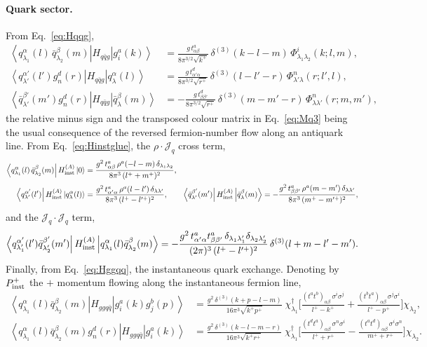 \documentclass[11pt]{article}
\newcommand{\dg}{\dagger}
\newcommand{\me}[3]{\left\langle #1 \right| #2 \left| #3 \right\rangle}
\newcommand{\dthree}{\delta^{(3)}}
\newcommand{\gl}[3]{g^{#1}_{#2}(#3)}
\newcommand{\qk}[3]{q^{#1}_{#2}(#3)}
\newcommand{\aqk}[3]{\bar q^{#1}_{#2}(#3)}
\newcommand{\Phiv}{\Phi}
\newcommand{\Hqqg}{H_{q\bar q g}}
\newcommand{\Hggqq}{H_{ggq\bar q}}
\begin{document}
\paragraph{Quark sector.} From Eq.~\eqref{eq:Hqqg},
\begin{align}
\me{\qk{\alpha}{\lambda_1}{l}\,\aqk{\beta}{\lambda_2}{m}}{\Hqqg}{\gl{a}{i}{k}}
&=\frac{g\,t^a_{\alpha\beta}}{8\pi^{3/2}\sqrt{k^+}}\,\dthree(k-l-m)\,
\Phiv^i_{\lambda_1\lambda_2}(k;l,m),
\label{eq:Mq1}\\[2pt]
\me{\qk{\alpha'}{\lambda'}{l'}\gl{d}{n}{r}}{\Hqqg}{\qk{\alpha}{\lambda}{l}}
&=\frac{g\,t^d_{\alpha'\alpha}}{8\pi^{3/2}\sqrt{r^+}}\,\dthree(l-l'-r)\,
\Phiv^n_{\lambda'\lambda}(r;l',l),
\label{eq:Mq2}\\[2pt]
\me{\aqk{\beta'}{\lambda'}{m'}\gl{d}{n}{r}}{\Hqqg}{\aqk{\beta}{\lambda}{m}}
&=-\frac{g\,t^d_{\beta\beta'}}{8\pi^{3/2}\sqrt{r^+}}\,\dthree(m-m'-r)\,
\Phiv^n_{\lambda\lambda'}(r;m,m'),
\label{eq:Mq3}
\end{align}
the relative minus sign and the transposed colour matrix in Eq.~\eqref{eq:Mq3} being the usual
consequence of the reversed fermion-number flow along an antiquark line. From
Eq.~\eqref{eq:Hinstglue}, the $\rho\!\cdot\!\mathcal J_q$ cross term,
\begin{align}
\me{\qk{\alpha}{\lambda_1}{l}\,\aqk{\beta}{\lambda_2}{m}}{H^{(A)}_{\rm inst}}{0}
&=\frac{g^2\,t^a_{\alpha\beta}\,\rho^a(-l-m)\,\delta_{\lambda_1\lambda_2}}{8\pi^3\,(l^++m^+)^2},
\label{eq:Mq4}\\[2pt]
\me{\qk{\alpha'}{\lambda'}{l'}}{H^{(A)}_{\rm inst}}{\qk{\alpha}{\lambda}{l}}
&=\frac{g^2\,t^a_{\alpha'\alpha}\,\rho^a(l-l')\,\delta_{\lambda\lambda'}}{8\pi^3\,(l^+-l'^+)^2},
\qquad
\me{\aqk{\beta'}{\lambda'}{m'}}{H^{(A)}_{\rm inst}}{\aqk{\beta}{\lambda}{m}}
=-\frac{g^2\,t^a_{\beta\beta'}\,\rho^a(m-m')\,\delta_{\lambda\lambda'}}{8\pi^3\,(m^+-m'^+)^2},
\label{eq:Mq5}
\end{align}
and the $\mathcal J_q\!\cdot\!\mathcal J_q$ term,
\begin{equation}
\me{\qk{\alpha'}{\lambda_1'}{l'}\aqk{\beta'}{\lambda_2'}{m'}}{H^{(A)}_{\rm inst}}
{\qk{\alpha}{\lambda_1}{l}\aqk{\beta}{\lambda_2}{m}}
=-\frac{g^2\,t^a_{\alpha'\alpha}t^a_{\beta\beta'}\,
\delta_{\lambda_1\lambda_1'}\delta_{\lambda_2\lambda_2'}}
{(2\pi)^3\,(l^+-l'^+)^2}\,\dthree(l+m-l'-m').
\label{eq:Mq6}
\end{equation}
Finally, from Eq.~\eqref{eq:Hggqq}, the instantaneous quark exchange. Denoting by $P^+_{\rm inst}$
the $+$ momentum flowing along the instantaneous fermion line,
\begin{align}
\me{\qk{\alpha}{\lambda_1}{l}\aqk{\beta}{\lambda_2}{m}}{\Hggqq}{\gl{a}{i}{k}\gl{b}{j}{p}}
&=\frac{g^2\,\dthree(k+p-l-m)}{16\pi^3\sqrt{k^+p^+}}\;
\chi^\dg_{\lambda_1}\Big[\frac{(t^at^b)_{\alpha\beta}\,\sigma^i\sigma^j}{l^+-k^+}
+\frac{(t^bt^a)_{\alpha\beta}\,\sigma^j\sigma^i}{l^+-p^+}\Big]\chi_{\lambda_2},
\label{eq:Mq7}\\[2pt]
\me{\qk{\alpha}{\lambda_1}{l}\aqk{\beta}{\lambda_2}{m}\gl{d}{n}{r}}{\Hggqq}{\gl{a}{i}{k}}
&=\frac{g^2\,\dthree(k-l-m-r)}{16\pi^3\sqrt{k^+r^+}}\;
\chi^\dg_{\lambda_1}\Big[\frac{(t^dt^a)_{\alpha\beta}\,\sigma^n\sigma^i}{l^++r^+}
-\frac{(t^at^d)_{\alpha\beta}\,\sigma^i\sigma^n}{m^++r^+}\Big]\chi_{\lambda_2}.
\label{eq:Mq8}
\end{align}
\end{document}
